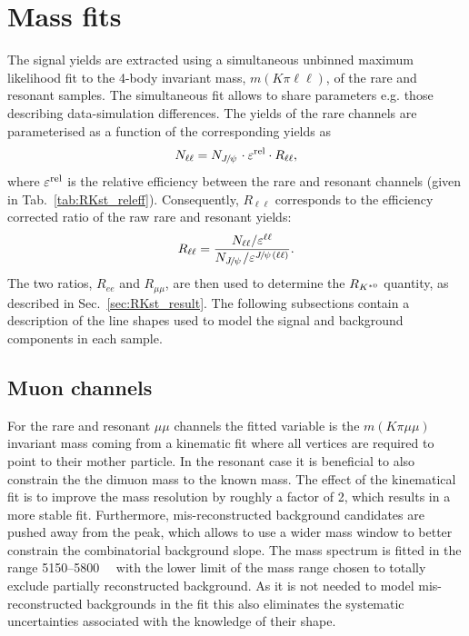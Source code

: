 \section{Mass fits}
\label{sec:rkst_fits}

The signal yields are extracted using a simultaneous unbinned maximum likelihood fit
to the 4-body invariant mass, $m(K\pi\ell\ell)$, of the rare and resonant samples.
The simultaneous fit allows to share parameters e.g. those describing data-simulation differences.
The yields of the rare channels are parameterised as a function of the corresponding \jpsi yields as
%
\begin{equation}
N_{\ell\ell} = N_{\jpsi} \cdot \varepsilon^{\rm rel} \cdot R_{\ell\ell},
\end{equation}
%
where $\varepsilon^{\rm rel}$ is the relative efficiency between the rare and resonant channels
(given in Tab.~\ref{tab:RKst_releff}). Consequently, $R_{\ell\ell}$ corresponds to the efficiency corrected
ratio of the raw rare and resonant yields:
%
\begin{equation}
R_{\ell\ell} = \frac{N_{\ell\ell} / \varepsilon^{\ell\ell}}{N_{\jpsi} / \varepsilon^{\jpsi(\ell\ell)}}.
\end{equation}
%
The two ratios, $R_{ee}$ and $R_{\mu\mu}$, are then used to determine
the $R_{{{K}^{*0}}}$ quantity, as described in Sec.~\ref{sec:RKst_result}.
The following subsections contain a description of the line shapes used to model
the signal and background components in each sample.

\subsection{Muon channels}

For the rare and resonant $\mu\mu$ channels the fitted variable is the $m(K\pi \mu\mu)$ invariant mass coming
from a kinematic fit where all vertices are required to point to their mother particle.
In the resonant case it is beneficial to also constrain the the dimuon mass to the known \jpsi mass.
The effect of the kinematical fit is to improve the mass resolution by roughly a factor of 2, which results
in a more stable fit. Furthermore, mis-reconstructed background candidates are pushed away from
the \Bz peak, which allows to use a wider mass window to better constrain the combinatorial background slope.
The mass spectrum is fitted in the range 5150--5800~\mevcc~ with the lower limit
of the mass range chosen to totally exclude partially reconstructed background.
As it is not needed to model mis-reconstructed backgrounds in the fit this also
eliminates the systematic uncertainties associated with the knowledge of their shape. 

